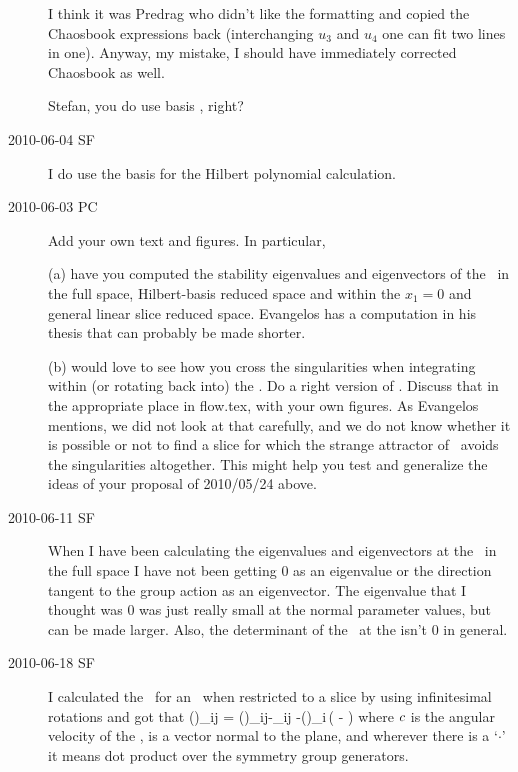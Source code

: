 \begin{description}
I think it was Predrag who didn't like the formatting and copied
the Chaosbook expressions back (interchanging $u_3$ and $u_4$ one
can fit two lines in one). Anyway, my mistake, I should have immediately
corrected Chaosbook as well.

Stefan, you do use basis , right?

\item[2010-06-04 SF]
I do use the basis  for the Hilbert polynomial
calculation.

\item[2010-06-03 PC]
Add your own text and figures. In particular,

(a) have you computed the
stability eigenvalues and eigenvectors of the \reqv\ in
the full space, Hilbert-basis reduced space and within the $x_1=0$ and
general linear slice reduced space. Evangelos has a computation in his thesis
that can probably be made shorter.

(b) would love to see how you cross the singularities when integrating
within (or rotating back into) the \reducedsp. Do a right version
of . Discuss that in the appropriate
place in flow.tex, with your own figures. As Evangelos mentions, we
did not look at that carefully, and we do not know whether it is
possible or not to find a slice for which the strange attractor
of \cLe\ avoids the singularities altogether.
This might help you test and generalize the ideas
of your proposal of 2010/05/24 above.


\item[2010-06-11 SF] When I have been calculating the eigenvalues and
eigenvectors at the \reqv\ in the full space I have not been getting 0 as
an eigenvalue or the direction tangent to the group action as an
eigenvector. The eigenvalue that I thought was 0 was just really small at
the normal parameter values, but can be made larger. Also, the
determinant of the \stabmat\ at the {\reqv} isn't 0 in general.

\item[2010-06-18 SF]
I calculated the \stabmat\ for an \reqv\ when restricted to a slice by
using infinitesimal rotations and got that
\beq
{\MvarRed}(\sspRed)_{ij} = \Mvar(\sspRed)_{ij}-\velRel \cdot \Lg_{ij}
     -\groupTan(\sspRed)_i\,\left(
     - \velRel {}
              \right)
where $c$ is the angular velocity of the \reqv, \sliceTan{} is a
vector normal to the plane, and wherever there is a `$\cdot$' it means
dot product over the symmetry group generators.


\end{description}

